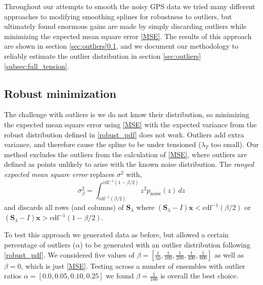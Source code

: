 \documentclass{ametsoc}
\begin{document}
Throughout our attempts to smooth the noisy GPS data we tried many different approaches to modifying smoothing splines for robustness to outliers, but ultimately found enormous gains are made by simply discarding outliers while minimizing the expected mean square error \eqref{MSE}. The results of this approach are shown in section \ref{sec:outliers}\ref{subsec:robust_minimization}, and we document our methodology to reliably estimate the outlier distribution in section \ref{sec:outliers}\ref{subsec:full_tension}.

\subsection{Robust minimization}
\label{subsec:robust_minimization}

The challenge with outliers is we do not know their distribution, so minimizing the expected mean square error using \eqref{MSE} with the expected variance from the robust distribution defined in \eqref{robust_pdf} does not work. Outliers add extra variance, and therefore cause the spline to be under tensioned ($\lambda_T$ too small). Our method excludes the outliers from the calculation of \eqref{MSE}, where outliers are defined as points unlikely to arise with the known noise distribution. The \emph{ranged expected mean square error} replaces $\sigma^2$ with,
\begin{equation}
\label{ranged_mse}
    \sigma_\beta^2 = \int_{\textrm{cdf}^{-1}(\beta/2)}^{\textrm{cdf}^{-1}(1-\beta/2)} z^2 p_{\textrm{noise}}(z) \, dz
\end{equation}
and discards all rows (and columns) of $\mathbf{S}_\lambda$ where $\left(\mathbf{S}_\lambda - I\right)\mathbf{x}<\textrm{cdf}^{-1}(\beta/2)$ or $\left(\mathbf{S}_\lambda - I\right)\mathbf{x}>\textrm{cdf}^{-1}(1-\beta/2)$.

To test this approach we generated data as before, but allowed a certain percentage of outliers ($\alpha$) to be generated with an outlier distribution following \eqref{robust_pdf}. We considered five values of $\beta=\left[\frac{1}{50},\frac{1}{100},\frac{1}{200},\frac{1}{400},\frac{1}{800} \right]$ as well as $\beta=0$, which is just \eqref{MSE}. Testing across a number of ensembles with outlier ratios $\alpha=\left[0.0,0.05,0.10,0.25\right]$ we found $\beta=\frac{1}{100}$ is overall the best choice.
\end{document}
